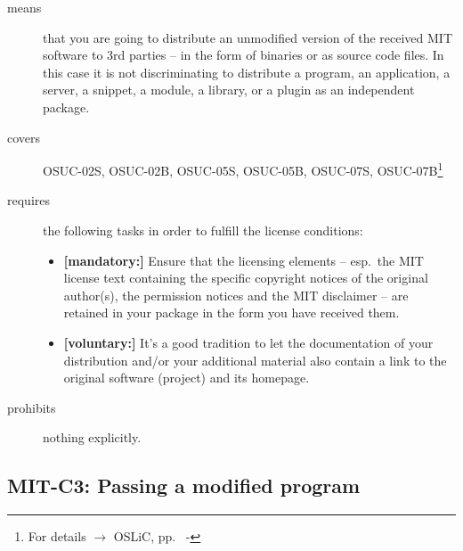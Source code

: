 \begin{description}
\item[means] that you are going to distribute an unmodified version of the
received MIT software to 3rd parties -- in the form of binaries or as source
code files. In this case it is not discriminating to distribute a
program, an application, a server, a snippet, a module, a library, or a plugin
as an independent package.

\item[covers] OSUC-02S,  OSUC-02B, OSUC-05S, OSUC-05B, OSUC-07S,
OSUC-07B\footnote{For details $\rightarrow$ OSLiC, pp.\
\pageref{OSUC-02S-DEF} - \pageref{OSUC-07B-DEF}}

\item[requires] the following tasks in order to fulfill the license conditions:
\begin{itemize}
  \item \textbf{[mandatory:]} Ensure that the licensing elements -- esp.\
  the MIT license text containing the specific copyright notices of the original
  author(s), the permission notices and the MIT disclaimer -- are retained in
  your package in the form you have received them.
  \item \textbf{[voluntary:]} It's a good tradition to let the documentation of
  your distribution and/or your additional material also contain a link to the
  original software (project) and its homepage.
\end{itemize}
\item[prohibits] nothing explicitly.
\end{description}

\subsection{MIT-C3: Passing a modified program}
\label{OSUC-04S-MIT} \label{OSUC-04B-MIT}

